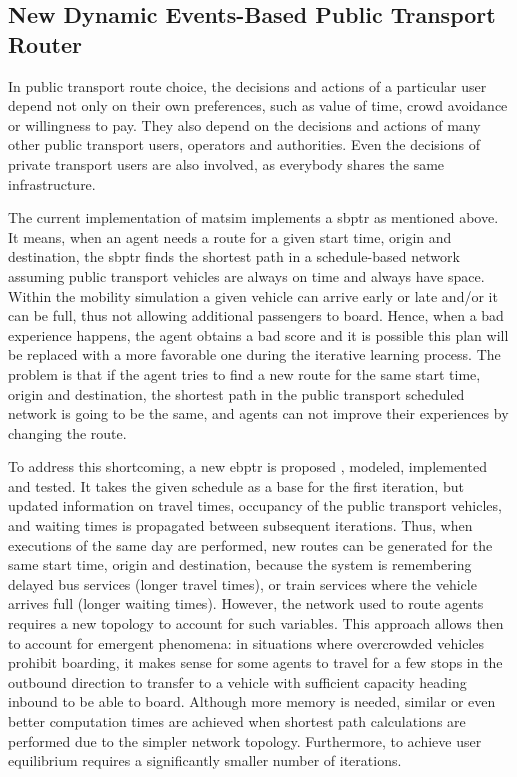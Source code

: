 \subsection{New Dynamic Events-Based Public Transport Router}
In public transport route choice, the decisions and actions of a particular user depend not only on their own preferences, such as value of time, crowd avoidance or willingness to pay. They also depend on the decisions and actions of many other public transport users, operators and authorities. Even the decisions of private transport users are also involved, as everybody shares the same infrastructure.

The current implementation of \gls{matsim} implements a \gls{sbptr} as mentioned above. It means, when an agent needs a route for a given start time, origin and destination, the \gls{sbptr} finds the shortest path in a schedule-based network assuming public transport vehicles are always on time and always have space. Within the mobility simulation a given vehicle can arrive early or late and/or it can be full, thus not allowing additional passengers to board. Hence, when a bad experience happens, the agent obtains a bad score and it is possible this plan will be replaced with a more favorable one during the iterative learning process. The problem is that if the agent tries to find a new route for the same start time, origin and destination, the shortest path in the public transport scheduled network is going to be the same, and agents can not improve their experiences by changing the route.

To address this shortcoming, a new \gls{ebptr} is proposed \citep[][]{OrdonezErath_TechRep_FCL_2013}, modeled, implemented and tested. It takes the given schedule as a base for the first iteration, but updated information on travel times, occupancy of the public transport vehicles, and waiting times is propagated between subsequent iterations. Thus, when executions of the same day are performed, new routes can be generated for the same start time, origin and destination, because the system is remembering delayed bus services (longer travel times), or train services where the vehicle arrives full (longer waiting times). However, the network used to route agents requires a new topology to account for such variables. This approach allows then to account for emergent phenomena: in situations where overcrowded vehicles prohibit boarding, it makes sense for some agents to travel for a few stops in the outbound direction to transfer to a vehicle with sufficient capacity heading inbound to be able to board. Although more memory is needed, similar or even better computation times are achieved when shortest path calculations are performed due to the simpler network topology. Furthermore, to achieve user equilibrium requires a significantly smaller number of iterations.

